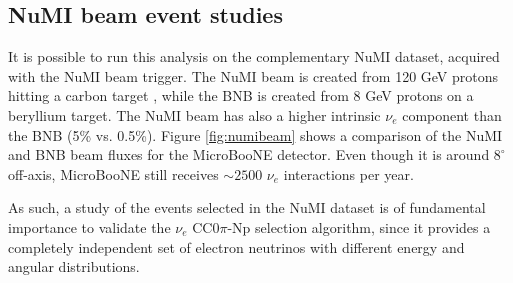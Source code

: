 
\subsection{NuMI beam event studies}
It is possible to run this analysis on the complementary NuMI dataset, acquired with the NuMI beam trigger. The NuMI beam is created from 120 GeV protons hitting a carbon target \cite{Adamson:2015dkw}, while the BNB is created from 8 GeV protons on a beryllium target. The NuMI beam has also a higher intrinsic $\nu_{e}$ component than the BNB (5\% vs. 0.5\%). Figure \ref{fig:numibeam} shows a comparison of the NuMI and BNB beam fluxes for the MicroBooNE detector. Even though it is around $8^{\circ}$ off-axis, MicroBooNE still receives $\sim2500$ $\nu_{e}$ interactions per year. 

As such, a study of the events selected in the NuMI dataset is of fundamental importance to validate the $\nu_{e}$ CC0$\pi$-Np selection algorithm, since it provides a completely independent set of electron neutrinos with different energy and angular distributions.

